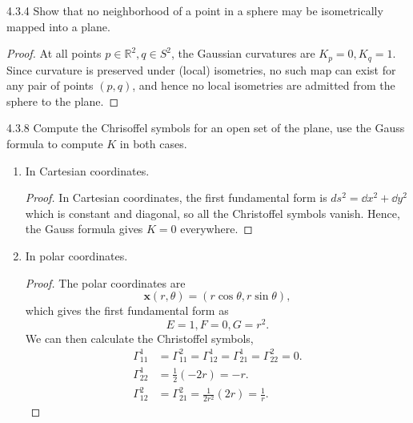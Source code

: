\documentclass[11pt]{article}
\begin{document}
\begin{problem}{4.3.4}
  Show that no neighborhood of a point in a sphere may be isometrically mapped into a plane.
\end{problem}
\begin{proof}
  At all points \( p \in \mathbb{R}^2, q \in S^2 \), the Gaussian curvatures are \( K_p = 0, K_q = 1 \).
  Since curvature is preserved under (local) isometries, no such map can exist for any pair of points \( (p,q) \), and hence no local isometries are admitted from the sphere to the plane.
\end{proof}

\begin{problem}{4.3.8}
  Compute the Chrisoffel symbols for an open set of the plane, use the Gauss formula to compute \( K \) in both cases.
  \begin{enumerate}[label=(\alph*)]
    \item In Cartesian coordinates.
          \begin{proof}
            In Cartesian coordinates, the first fundamental form is \( ds^2 = \dd{x}^2 + \dd{y}^2 \) which is constant and diagonal, so all the Christoffel symbols vanish.
            Hence, the Gauss formula gives \( K = 0 \) everywhere.
          \end{proof}
    \item In polar coordinates.
          \begin{proof}
            The polar coordinates are
            \begin{equation}
            \label{eq:15}
            \mathbf{x}(r,\theta) = (r\cos\theta, r\sin\theta),
          \end{equation}
          which gives the first fundamental form as
          \begin{equation}
          \label{eq:16}
          E = 1, F = 0, G = r^2.
        \end{equation}
        We can then calculate the Christoffel symbols,
        \begin{equation}
        \label{eq:17}
        \begin{aligned}
          \Gamma_{11}^1 &= \Gamma_{11}^2 = \Gamma_{12}^1 = \Gamma_{21}^1 = \Gamma_{22}^2 = 0. \\
          \Gamma_{22}^1 &= \frac{1}{2}(-2r) = -r. \\
          \Gamma_{12}^2 &= \Gamma_{21}^2 = \frac{1}{2r^2}(2r) = \frac{1}{r}.
        \end{aligned}
      \end{equation}

\end{proof}
\end{enumerate}
\end{problem}
\end{document}
